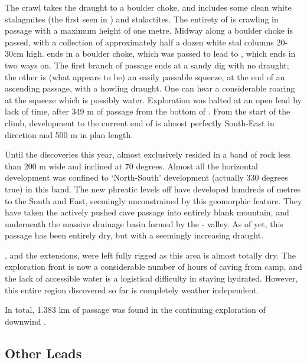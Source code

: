 The  crawl takes the
draught to a boulder choke, and includes some clean white stalagmites
(the first seen in ) and stalactites. The entirety of
 is crawling in passage with a maximum height of one
metre. Midway along  a boulder choke is passed, with a
collection of approximately half a dozen white stal columns 20-30cm
high.  ends in a boulder choke, which was passed to lead
to , which ends in two ways on. The first branch of
passage ends at a sandy dig with no draught; the other is (what appears
to be) an easily passable squeeze, at the end of an ascending passage,
with a howling draught. One can hear a considerable roaring at the
squeeze which is possibly water. Exploration was halted at an open lead
by lack of time, after 349 m of passage from the bottom of . From the start of the  climb, development
to the current end of  is almost perfectly South-East in
direction and 500 m in plan length.

Until the discoveries this year,  almost exclusively
resided in a band of rock less than 200 m wide and inclined at 70
degrees. Almost all the horizontal development was confined to
`North-South' development (actually 330 degrees true) in this band. The
new phreatic levels off  have developed hundreds of
metres to the South and East, seemingly unconstrained by this geomorphic
feature. They have taken the actively pushed cave passage into entirely
blank mountain, and underneath the massive drainage basin formed by the
- valley. As of yet, this passage has been entirely dry, but
with a seemingly increasing draught.

, and the  extensions, were left fully
rigged as this area is almost totally dry. The exploration front is now
a considerable number of hours of caving from camp, and the lack of
accessible water is a logistical difficulty in staying hydrated.
However, this entire region discovered so far is completely weather
independent.

In total, 1.383 km of passage was found in the continuing exploration of downwind .


\subsection{Other Leads}

